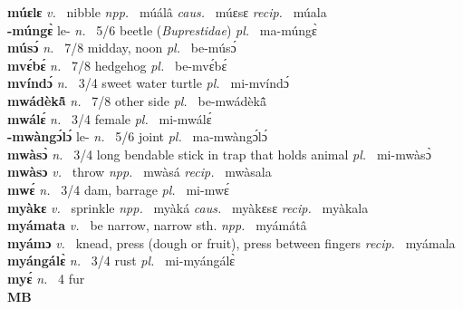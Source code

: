 {\bfseries múɛlɛ}  {\itshape v.~} nibble   {\itshape npp.~} múálâ {\itshape caus.~} múɛsɛ {\itshape recip.~} múala  \\ 
{\bfseries -múngɛ̀} le- {\itshape n.~} 5/6 beetle ({\itshape Buprestidae}) {\itshape pl.~} ma-múngɛ̀    \\ 
{\bfseries músɔ́}  {\itshape n.~} 7/8 midday, noon {\itshape pl.~} be-músɔ́    \\ 
{\bfseries mvɛ́bɛ́}  {\itshape n.~} 7/8 hedgehog {\itshape pl.~} be-mvɛ́bɛ́    \\ 
{\bfseries mvíndɔ́}  {\itshape n.~} 3/4 sweet water turtle {\itshape pl.~} mi-mvíndɔ́    \\ 
{\bfseries mwádèkã̂}  {\itshape n.~} 7/8 other side {\itshape pl.~} be-mwádèkã̂    \\ 
{\bfseries mwálɛ́}  {\itshape n.~} 3/4 female {\itshape pl.~} mi-mwálɛ́    \\ 
{\bfseries -mwàngɔ́lɔ́} le- {\itshape n.~} 5/6 joint {\itshape pl.~} ma-mwàngɔ́lɔ́    \\ 
{\bfseries mwàsɔ̀}  {\itshape n.~} 3/4 long bendable stick in trap that holds animal {\itshape pl.~} mi-mwàsɔ̀    \\ 
{\bfseries mwàsɔ}  {\itshape v.~} throw   {\itshape npp.~} mwàsá {\itshape recip.~} mwàsala  \\ 
{\bfseries mwɛ́}  {\itshape n.~} 3/4 dam, barrage {\itshape pl.~} mi-mwɛ́    \\ 
{\bfseries myàkɛ}  {\itshape v.~} sprinkle   {\itshape npp.~} myàká {\itshape caus.~} myàkɛsɛ {\itshape recip.~} myàkala  \\ 
{\bfseries myámata}  {\itshape v.~} be narrow, narrow sth.   {\itshape npp.~} myámátâ  \\ 
{\bfseries myámɔ}  {\itshape v.~} knead, press (dough or fruit), press between fingers {\itshape recip.~} myámala \\ 
{\bfseries myángálɛ̀}  {\itshape n.~} 3/4 rust {\itshape pl.~} mi-myángálɛ̀    \\ 
{\bfseries myɛ́}  {\itshape n.~} 4 fur    \\ 

\medskip
\noindent \large {\bfseries MB}\normalsize\\
\medskip

